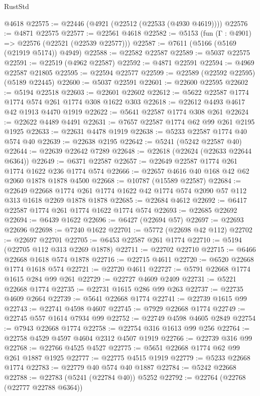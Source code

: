 \begin{lexlean}{RustStd}
\begin{coremodule}
{\begin{coremodule}
{{{{{{{{{{{{{{{{{{{{{{{{{{{{{    @4618
@22575 := @22446 (@4921 (@22512 (@22533 (@4930 @4619))))
@22576 := @4871 @22575
@22577 := @22561 @4618
@22582 := @5153 (fun (Γ : @4901) => @22576 (@22521 (@22539 @22577)))
@22587 := @7611 (@5166 (@5169 (@21919 @5174)) @4949)
@22588 := @22582 @22587
@22589 := @5037 @22575
@22591 := @22519 (@4962 @22587)
@22592 := @4871 @22591
@22594 := @4969 @22587 @21805
@22595 := @22594 @22577
@22599 := @22589 (@22592 @22595) (@5189 @22445)
@22600 := @5037 @22591
@22601 := @22600 @22595
@22602 := @5194 @22518
@22603 := @22601 @22602
@22612 := @5622 @22587 @1774 @1774 @574 @261 @1774 @308 @1622 @303
@22618 := @22612 @4493 @4617 @42 @1913 @4470 @1919
@22622 := @5641 @22587 @1774 @308 @261
@22624 := @22622 @4489 @4491
@22631 := @7657 @22587 @1774 @62 @99 @261 @2195 @1925
@22633 := @22631 @4478 @1919
@22638 := @5233 @22587 @1774 @40 @574 @40
@22639 := @22638 @2195
@22642 := @5241 (@5242 @22587 @40)
@22644 := @22639 @22642 @7289
@22648 := @22618 (@22624 (@22633 @22644 @6364))
@22649 := @6371 @22587
@22657 := @22649 @22587 @1774 @261 @1774 @1622 @236 @1774 @574
@22666 := @22657 @4616 @40 @168 @42 @62 @2060 @1878 @1878 @4500
@22668 := @10787 (@15589 @22587)
@22684 := @22649
    @22668
    @1774
    @261
    @1774
    @1622
    @42
    @1774
    @574
    @2090
    @57
    @112
    @313
    @1618
    @2269
    @1878
    @1878
@22685 := @22684 @4612
@22692 := @6417 @22587 @1774 @261 @1774 @1622 @1774 @574
@22693 := @22685 @22692
@22694 := @6439 @1622
@22696 := @6427 (@22694 @57)
@22697 := @22693 @22696
@22698 := @7240 @1622
@22701 := @5772 (@22698 @42 @112)
@22702 := @22697 @22701
@22705 := @6453 @22587 @261 @1774
@22710 := @5194 (@22705 @112 @313 @2269 @1878)
@22711 := @22702 @22710
@22715 := @6466 @22668 @1618 @574 @1878
@22716 := @22715 @4611
@22720 := @6520 @22668 @1774 @1618 @574
@22721 := @22720 @4611
@22727 := @5791 @22668 @1774 @1615 @284 @99 @261
@22729 := @22727 @4609 @2409
@22731 := @5221 @22668 @1774
@22735 := @22731 @1615 @286 @99 @263
@22737 := @22735 @4609 @2664
@22739 := @5641 @22668 @1774
@22741 := @22739 @1615 @99
@22743 := @22741 @4598 @4607
@22745 := @7929 @22668 @1774
@22749 := @22745 @557 @1614 @7934 @99
@22752 := @22749 @4598 @4605 @2849
@22754 := @7943 @22668 @1774
@22758 := @22754 @316 @1613 @99 @256
@22764 := @22758 @4529 @4597 @4604 @2312 @4507 @1919
@22766 := @22739 @316 @99
@22768 := @22766 @4525 @4527
@22775 := @5651 @22668 @1774 @62 @99 @261 @1887 @1925
@22777 := @22775 @4515 @1919
@22779 := @5233 @22668 @1774
@22783 := @22779 @40 @574 @40 @1887
@22784 := @5242 @22668
@22788 := @22783 (@5241 (@22784 @40)) @5252
@22792 := @22764 (@22768 (@22777 @22788 @6364))
}}}}}}}}}}}}}}}}}}}}}}}}}}}}}
\end{coremodule}}
\end{coremodule}
\end{lexlean}

